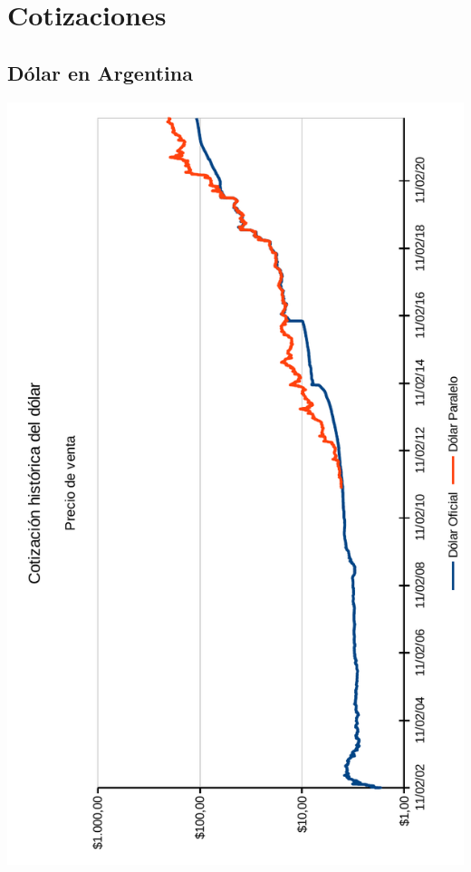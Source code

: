 \documentclass[12pt,a4paper,twoside]{book}
\begin{document}
\section{Cotizaciones}
\subsection{Dólar en Argentina}


\newpage

\begin{center}
\includegraphics[scale=0.975]{img/evol-dolar.pdf}
\end{center}
\end{document}
